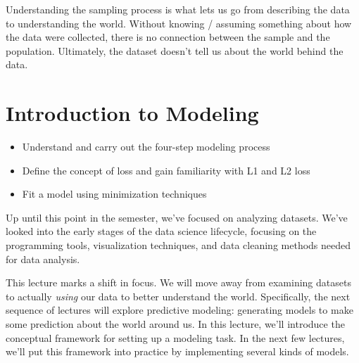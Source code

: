 \documentclass[
  letterpaper,
  DIV=11,
  numbers=noendperiod]{scrreprt}
\providecommand{\tightlist}{%
  \setlength{\itemsep}{0pt}\setlength{\parskip}{0pt}}\usepackage{longtable,booktabs,array}
\begin{document}
Understanding the sampling process is what lets us go from describing
the data to understanding the world. Without knowing / assuming
something about how the data were collected, there is no connection
between the sample and the population. Ultimately, the dataset doesn't
tell us about the world behind the data.


\hypertarget{introduction-to-modeling}{%
\chapter{Introduction to Modeling}\label{introduction-to-modeling}}

\begin{tcolorbox}[enhanced jigsaw, rightrule=.15mm, colframe=quarto-callout-note-color-frame, colback=white, breakable, opacityback=0, arc=.35mm, bottomrule=.15mm, colbacktitle=quarto-callout-note-color!10!white, left=2mm, title=\textcolor{quarto-callout-note-color}{\faInfo}\hspace{0.5em}{Note}, toptitle=1mm, titlerule=0mm, bottomtitle=1mm, toprule=.15mm, leftrule=.75mm, coltitle=black, opacitybacktitle=0.6]

\begin{itemize}
\tightlist
\item
  Understand and carry out the four-step modeling process
\item
  Define the concept of loss and gain familiarity with L1 and L2 loss
\item
  Fit a model using minimization techniques
\end{itemize}

\end{tcolorbox}

Up until this point in the semester, we've focused on analyzing
datasets. We've looked into the early stages of the data science
lifecycle, focusing on the programming tools, visualization techniques,
and data cleaning methods needed for data analysis.

This lecture marks a shift in focus. We will move away from examining
datasets to actually \emph{using} our data to better understand the
world. Specifically, the next sequence of lectures will explore
predictive modeling: generating models to make some prediction about the
world around us. In this lecture, we'll introduce the conceptual
framework for setting up a modeling task. In the next few lectures,
we'll put this framework into practice by implementing several kinds of
models.
\end{document}
